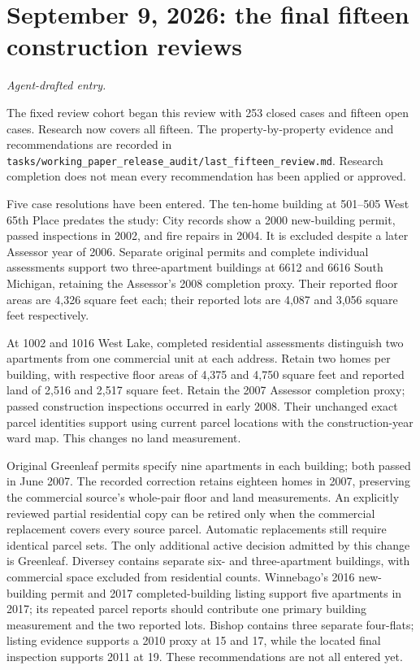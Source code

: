 \clearpage
\section*{September 9, 2026: the final fifteen construction reviews}
\textit{Agent-drafted entry.}

The fixed review cohort began this review with 253 closed cases and fifteen open cases. Research now covers all fifteen. The property-by-property evidence and recommendations are recorded in \texttt{tasks/working\_paper\_release\_audit/last\_fifteen\_review.md}. Research completion does not mean every recommendation has been applied or approved.

Five case resolutions have been entered. The ten-home building at 501--505 West 65th Place predates the study: City records show a 2000 new-building permit, passed inspections in 2002, and fire repairs in 2004. It is excluded despite a later Assessor year of 2006. Separate original permits and complete individual assessments support two three-apartment buildings at 6612 and 6616 South Michigan, retaining the Assessor's 2008 completion proxy. Their reported floor areas are 4,326 square feet each; their reported lots are 4,087 and 3,056 square feet respectively.

At 1002 and 1016 West Lake, completed residential assessments distinguish two apartments from one commercial unit at each address. Retain two homes per building, with respective floor areas of 4,375 and 4,750 square feet and reported land of 2,516 and 2,517 square feet. Retain the 2007 Assessor completion proxy; passed construction inspections occurred in early 2008. Their unchanged exact parcel identities support using current parcel locations with the construction-year ward map. This changes no land measurement.

Original Greenleaf permits specify nine apartments in each building; both passed in June 2007. The recorded correction retains eighteen homes in 2007, preserving the commercial source's whole-pair floor and land measurements. An explicitly reviewed partial residential copy can be retired only when the commercial replacement covers every source parcel. Automatic replacements still require identical parcel sets. The only additional active decision admitted by this change is Greenleaf. Diversey contains separate six- and three-apartment buildings, with commercial space excluded from residential counts. Winnebago's 2016 new-building permit and 2017 completed-building listing support five apartments in 2017; its repeated parcel reports should contribute one primary building measurement and the two reported lots. Bishop contains three separate four-flats; listing evidence supports a 2010 proxy at 15 and 17, while the located final inspection supports 2011 at 19. These recommendations are not all entered yet.

